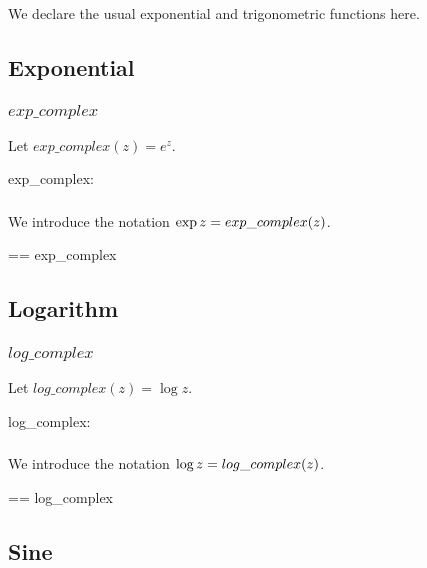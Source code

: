 \documentclass{amsart}
\begin{document}
We declare the usual exponential and trigonometric functions here.

\subsection{Exponential}

\subsubsection{$exp\_complex$}

Let $exp\_complex(z) = e^z$.

\begin{axdef}
	exp\_complex: \C \fun \C
\end{axdef}

\subsubsection{}

We introduce the notation $\operatorname{exp} z = exp\_complex(z)$.

\begin{zed}
	\expC == exp\_complex
\end{zed}

\subsection{Logarithm}

\subsubsection{$log\_complex$}

Let $log\_complex(z) = \log z$.

\begin{axdef}
	log\_complex: \Cnz \fun \C
\end{axdef}

\subsubsection{}

We introduce the notation $\operatorname{log} z = log\_complex(z)$.

\begin{zed}
	\logC == log\_complex
\end{zed}

\subsection{Sine}
\end{document}
